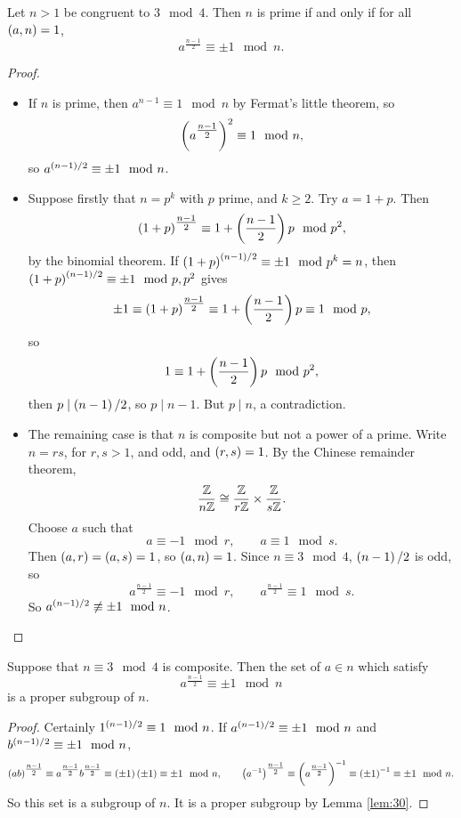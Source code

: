 \begin{lemma}
\label{lem:30}
Let $ n > 1 $ be congruent to $ 3 \mod 4 $. Then $ n $ is prime if and only if for all $ \left( a, n \right) = 1 $,
$$ a^{\tfrac{n - 1}{2}} \equiv \pm 1 \mod n. $$
\end{lemma}

\begin{proof}
\hfill
\begin{itemize}
\item If $ n $ is prime, then $ a^{n - 1} \equiv 1 \mod n $ by Fermat's little theorem, so
$$ \left( a^{\tfrac{n - 1}{2}} \right)^2 \equiv 1 \mod n, $$
so $ a^{\left( n - 1 \right) / 2} \equiv \pm 1 \mod n $.
\item Suppose firstly that $ n = p^k $ with $ p $ prime, and $ k \ge 2 $. Try $ a = 1 + p $. Then
$$ \left( 1 + p \right)^{\tfrac{n - 1}{2}} \equiv 1 + \left( \dfrac{n - 1}{2} \right)p \mod p^2, $$
by the binomial theorem. If $ \left( 1 + p \right)^{\left( n - 1 \right) / 2} \equiv \pm 1 \mod p^k = n $, then $ \left( 1 + p \right)^{\left( n - 1 \right) / 2} \equiv \pm 1 \mod p, p^2 $ gives
$$ \pm 1 \equiv \left( 1 + p \right)^{\tfrac{n - 1}{2}} \equiv 1 + \left( \dfrac{n - 1}{2} \right)p \equiv 1 \mod p, $$
so
$$ 1 \equiv 1 + \left( \dfrac{n - 1}{2} \right)p \mod p^2, $$
then $ p \mid \left( n - 1 \right) / 2 $, so $ p \mid n - 1 $. But $ p \mid n $, a contradiction.
\item The remaining case is that $ n $ is composite but not a power of a prime. Write $ n = rs $, for $ r, s > 1 $, and odd, and $ \left( r, s \right) = 1 $. By the Chinese remainder theorem,
$$ \dfrac{\mathbb{Z}}{n\mathbb{Z}} \cong \dfrac{\mathbb{Z}}{r\mathbb{Z}} \times \dfrac{\mathbb{Z}}{s\mathbb{Z}}. $$
Choose $ a $ such that
$$ a \equiv -1 \mod r, \qquad a \equiv 1 \mod s. $$
Then $ \left( a, r \right) = \left( a, s \right) = 1 $, so $ \left( a, n \right) = 1 $. Since $ n \equiv 3 \mod 4 $, $ \left( n - 1 \right) / 2 $ is odd, so
$$ a^{\tfrac{n - 1}{2}} \equiv -1 \mod r, \qquad a^{\tfrac{n - 1}{2}} \equiv 1 \mod s. $$
So $ a^{\left( n - 1 \right) / 2} \not\equiv \pm 1 \mod n $.
\end{itemize}
\end{proof}

\begin{lemma}
\label{lem:31}
Suppose that $ n \equiv 3 \mod 4 $ is composite. Then the set of $ a \in \unit{n} $ which satisfy
$$ a^{\tfrac{n - 1}{2}} \equiv \pm 1 \mod n $$
is a proper subgroup of $ \unit{n} $.
\end{lemma}

\begin{proof}
Certainly $ 1^{\left( n - 1 \right) / 2} \equiv 1 \mod n $. If $ a^{\left( n - 1 \right) / 2} \equiv \pm 1 \mod n $ and $ b^{\left( n - 1 \right) / 2} \equiv \pm 1 \mod n $,
$$ \left( ab \right)^{\tfrac{n - 1}{2}} \equiv a^{\tfrac{n - 1}{2}}b^{\tfrac{n - 1}{2}} \equiv \left( \pm 1 \right)\left( \pm 1 \right) \equiv \pm 1 \mod n, \qquad \left( a^{-1} \right)^{\tfrac{n - 1}{2}} \equiv \left( a^{\tfrac{n - 1}{2}} \right)^{-1} \equiv \left( \pm 1 \right)^{-1} \equiv \pm 1 \mod n. $$
So this set is a subgroup of $ \unit{n} $. It is a proper subgroup by Lemma \ref{lem:30}.
\end{proof}

